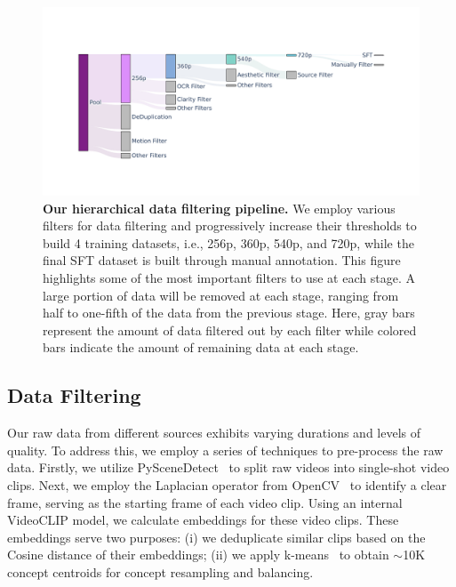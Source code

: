 \begin{figure}[t]
    \centering
    \includegraphics[trim=1cm 2cm 2cm 1cm,width=\linewidth]{figures/video-data-curation.pdf}
     \caption{
     \textbf{Our hierarchical data filtering pipeline.} 
     We employ various filters for data filtering and progressively increase their thresholds to build 4 training datasets, i.e., 256p, 360p, 540p, and 720p, while the final SFT dataset is built through manual annotation. This figure highlights some of the most important filters to use at each stage. A large portion of data will be removed at each stage, ranging from half to one-fifth of the data from the previous stage. 
     Here, gray bars represent the amount of data filtered out by each filter while colored bars indicate the amount of remaining data at each stage.
     }
    \label{fig:video-data-curation}
\end{figure}


\subsection{Data Filtering}
\label{data_filtering}

Our raw data from different sources exhibits varying durations and levels of quality. To address this, we employ a series of techniques to pre-process the raw data. Firstly, we utilize PySceneDetect~\cite{pyscene} to split raw videos into single-shot video clips. Next, we employ the Laplacian operator from OpenCV~\cite{opencv} to identify a clear frame, serving as the starting frame of each video clip. Using an internal VideoCLIP model, we calculate embeddings for these video clips. These embeddings serve two purposes: (i) we deduplicate similar clips based on the Cosine distance of their embeddings; (ii) we apply k-means~\cite{macqueen1967some} to obtain $\sim$10K concept centroids for concept resampling and balancing.

